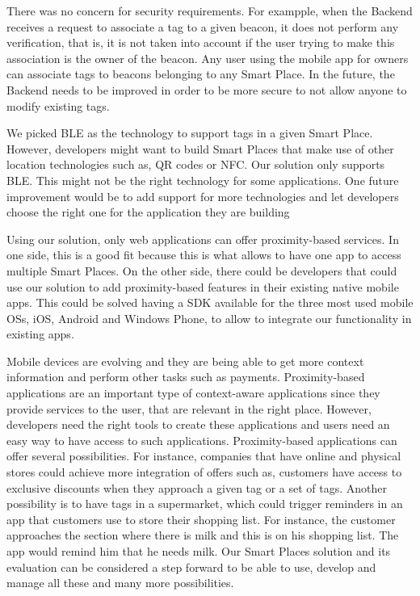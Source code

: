 There was no concern for security requirements. For exampple, when the Backend receives a request to associate a tag to a given beacon, it does not perform any verification, that is, it is not taken into account if the user trying to make this association is the owner of the beacon.
Any user using the mobile app for owners can associate tags to beacons belonging to any Smart Place.
In the future, the Backend needs to be improved in order to be more secure to not allow anyone to modify existing tags.

We picked \gls{BLE} as the technology to support tags in a given Smart Place.
However, developers might want to build Smart Places that make use of other location technologies such as, \gls{QR} codes or \gls{NFC}.
Our solution only supports \gls{BLE}.
This might not be the right technology for some applications.
One future improvement would be to add support for more technologies and let developers choose the right one for the application they are building

Using our solution, only web applications can offer proximity-based services.
In one side, this is a good fit because this is what allows to have one app to access multiple Smart Places.
On the other side, there could be developers that could use our solution to add proximity-based features in their existing native mobile apps.
This could be solved having a \gls{SDK} available for the three most used mobile \glspl{OS}, iOS, Android and Windows Phone, to allow to integrate our functionality in existing apps.

Mobile devices are evolving and they are being able to get more context information and perform other tasks such as payments.
Proximity-based applications are an important type of context-aware applications since they provide services to the user, that are relevant in the right place.
However, developers need the right tools to create these applications and users need an easy way to have access to such applications.
Proximity-based applications can offer several possibilities.
For instance, companies that have online and physical stores could achieve more integration of offers such as, customers have access to exclusive discounts when they approach a given tag or a set of tags.
Another possibility is to have tags in a supermarket, which could trigger reminders in an app that customers use to store their shopping list.
For instance, the customer approaches the section where there is milk and this is on his shopping list. The app would remind him that he needs milk.
Our Smart Places solution and its evaluation can be considered a step forward to be able to use, develop and manage all these and many more possibilities.
